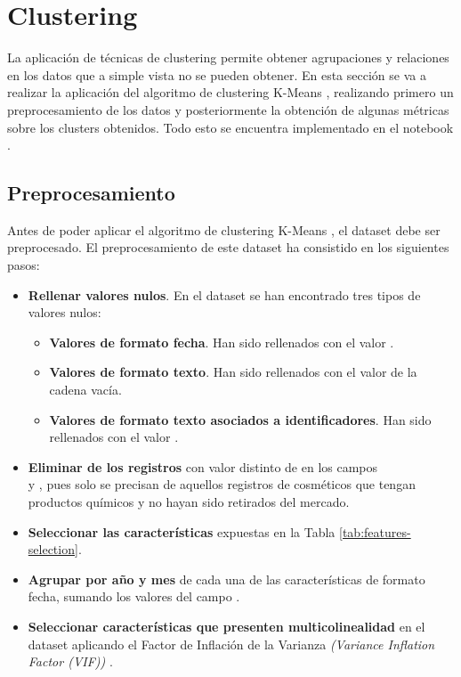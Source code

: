 
\section{Clustering}

La aplicación de técnicas de clustering permite obtener agrupaciones y relaciones en los datos que a simple vista no se pueden obtener. En esta sección se va a realizar la aplicación del algoritmo de clustering K-Means \citep{scikit-learn}, realizando primero un preprocesamiento de los datos y posteriormente la obtención de algunas métricas sobre los clusters obtenidos. Todo esto se encuentra implementado en el notebook \\  \citep{master}.


\subsection{Preprocesamiento}
\label{sec:clustering-preprocessing}

Antes de poder aplicar el algoritmo de clustering K-Means \citep{scikit-learn}, el dataset debe ser preprocesado. El preprocesamiento de este dataset ha consistido en los siguientes pasos:

\begin{itemize}
 \item \textbf{Rellenar valores nulos}. En el dataset se han encontrado tres tipos de valores nulos: 
 \begin{itemize}
  \item \textbf{Valores de formato fecha}. Han sido rellenados con el valor .
  \item \textbf{Valores de formato texto}. Han sido rellenados con el valor de la cadena vacía.
  \item \textbf{Valores de formato texto asociados a identificadores}. Han sido rellenados con el valor .
 \end{itemize}
 
 \item \textbf{Eliminar de los registros} con valor distinto de  en los campos \\  y , pues solo se precisan de aquellos registros de cosméticos que tengan productos químicos y no hayan sido retirados del mercado.

 \item \textbf{Seleccionar las características} expuestas en la Tabla \ref{tab:features-selection}.
 \item \textbf{Agrupar por año y mes} de cada una de las características de formato fecha, sumando los valores del campo .
 \item \textbf{Seleccionar características que presenten multicolinealidad} en el dataset aplicando el Factor de Inflación de la Varianza \textit{(Variance Inflation Factor (VIF))} \citep{vif}.
\end{itemize}

